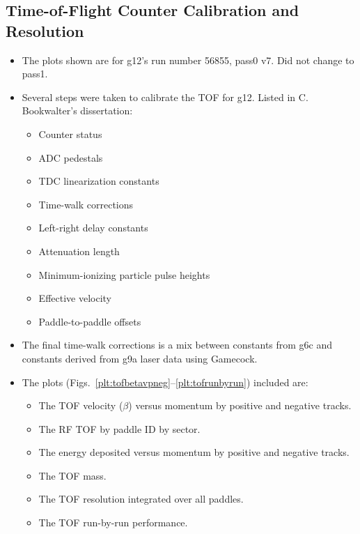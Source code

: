 \subsection{\label{sec:calib.tof}Time-of-Flight Counter Calibration and Resolution}

\begin{itemize}
    \item The plots shown are for g12's run number 56855, pass0 v7. Did not change to pass1.
    \item Several steps were taken to calibrate the TOF for g12. Listed in C. Bookwalter's dissertation\cite{clas.thesis.bookwalter}:
    \begin{itemize}
        \item Counter status
        \item ADC pedestals
        \item TDC linearization constants
        \item Time-walk corrections
        \item Left-right delay constants
        \item Attenuation length
        \item Minimum-ionizing particle pulse heights
        \item Effective velocity
        \item Paddle-to-paddle offsets
    \end{itemize}
    \item The final time-walk corrections is a mix between constants from g6c and constants derived from g9a laser data using Gamecock.
    \item The plots (Figs.~\ref{plt:tofbetavpneg}--\ref{plt:tofrunbyrun}) included are:
    \begin{itemize}
        \item The TOF velocity ($\beta$) versus momentum by positive and negative tracks.
        \item The RF TOF by paddle ID by sector.
        \item The energy deposited versus momentum by positive and negative tracks.
        \item The TOF mass.
        \item The TOF resolution integrated over all paddles.
        \item The TOF run-by-run performance.
    \end{itemize}
\end{itemize}

